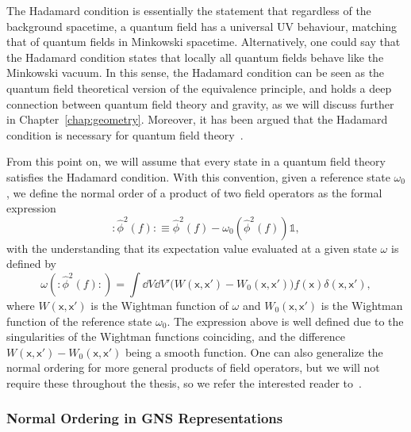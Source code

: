 \documentclass[letterpaper,12pt,titlepage,oneside,final]{book}
\newcommand{\normord}[1]{\vcentcolon\mathrel{#1}\vcentcolon}
\providecommand{\vcentcolon}{\mathrel{\mathop{:}}}
\newcommand{\openone}{\mathds{1}}
\newcommand{\mf}{\mathsf}%
\begin{document}
The Hadamard condition is essentially the statement that regardless of the background spacetime, a quantum field has a universal UV behaviour, matching that of quantum fields in Minkowski spacetime. Alternatively, one could say that the Hadamard condition states that locally all quantum fields behave like the Minkowski vacuum. In this sense, the Hadamard condition can be seen as the quantum field theoretical version of the equivalence principle, and holds a deep connection between quantum field theory and gravity, as we will discuss further in Chapter~\ref{chap:geometry}. Moreover, it has been argued that the Hadamard condition is necessary for quantum field theory~\cite{necessityHadamard}.

From this point on, we will assume that every state in a quantum field theory satisfies the Hadamard condition. With this convention, given a reference state $\omega_0$, we define the normal order of a product of two field operators as the formal expression
\begin{equation}\label{eq:normordphi2fgen}
    \normord{\hat{\phi}^2(f)} \equiv \hat{\phi}^2(f) - \omega_0(\hat{\phi}^2(f))\openone,
\end{equation}
with the understanding that its expectation value evaluated at a given state $\omega$ is defined by
\begin{equation}
    \omega(\normord{\hat{\phi}^2(f)}) = \int \dd V \dd V'\big(W(\mf x, \mf x') - W_0(\mf x, \mf x')\big)f(\mf x)\delta(\mf x, \mf x'),
\end{equation}
where $W(\mf x, \mf x')$ is the Wightman function of $\omega$ and $W_0(\mf x, \mf x')$ is the Wightman function of the reference state $\omega_0$. The expression above is well defined due to the singularities of the Wightman functions coinciding, and the difference $W(\mf x, \mf x') - W_0(\mf x, \mf x')$ being a smooth function. One can also generalize the normal ordering for more general products of field operators, but we will not require these throughout the thesis, so we refer the interested reader to~\cite{TheBookHadamard}. 

\subsubsection*{Normal Ordering in GNS Representations}
\end{document}
